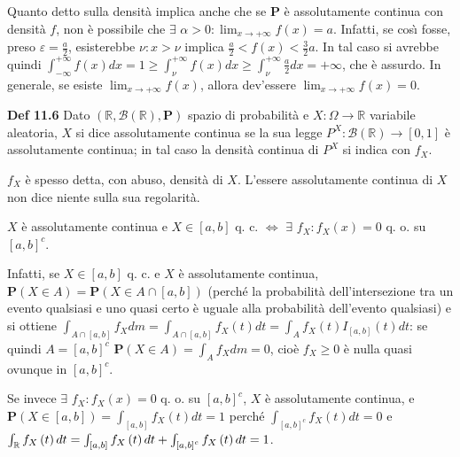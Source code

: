 \documentclass{article}
\begin{document}
Quanto detto sulla densit\`{a} implica anche che se $\mathbf{P}$ \`{e}
assolutamente continua con densit\`{a} $f$, non \`{e} possibile che $\exists 
$ $\alpha >0:\lim_{x\rightarrow +\infty }f\left( x\right) =a$. Infatti, se
cos\`{\i} fosse, preso $\varepsilon =\frac{a}{2}$, esisterebbe $\nu :x>\nu $
implica $\frac{a}{2}<f\left( x\right) <\frac{3}{2}a$. In tal caso si avrebbe
quindi $\int_{-\infty }^{+\infty }f\left( x\right) dx=1\geq \int_{\nu
}^{+\infty }f\left( x\right) dx\geq \int_{\nu }^{+\infty }\frac{a}{2}%
dx=+\infty $, che \`{e} assurdo. In generale, se esiste $\lim_{x\rightarrow
+\infty }f\left( x\right) $, allora dev'essere $\lim_{x\rightarrow +\infty
}f\left( x\right) =0$.

\textbf{Def 11.6} Dato $\left( 
\mathbb{R}
,\mathcal{B}\left( 
\mathbb{R}
\right) ,\mathbf{P}\right) $ spazio di probabilit\`{a} e $X:\Omega
\rightarrow 
\mathbb{R}
$ variabile aleatoria, $X$ si dice assolutamente continua se la sua legge $%
P^{X}:\mathcal{B}\left( 
\mathbb{R}
\right) \rightarrow \left[ 0,1\right] $ \`{e} assolutamente continua; in tal
caso la densit\`{a} continua di $P^{X}$ si indica con $f_{X}$.

$f_{X}$ \`{e} spesso detta, con abuso, densit\`{a} di $X$. L'essere
assolutamente continua di $X$ non dice niente sulla sua regolarit\`{a}.

$X$ \`{e} assolutamente continua e $X\in \left[ a,b\right] $ q. c. $%
\Longleftrightarrow $ $\exists $ $f_{X}:f_{X}\left( x\right) =0$ q. o. su $%
\left[ a,b\right] ^{c}$.

Infatti, se $X\in \left[ a,b\right] $ q. c. e $X$ \`{e} assolutamente
continua, $\mathbf{P}\left( X\in A\right) =\mathbf{P}\left( X\in A\cap \left[
a,b\right] \right) $ (perch\'{e} la probabilit\`{a} dell'intersezione tra un
evento qualsiasi e uno quasi certo \`{e} uguale alla probabilit\`{a}
dell'evento qualsiasi) e si ottiene $\int_{A\cap \left[ a,b\right]
}f_{X}dm=\int_{A\cap \left[ a,b\right] }f_{X}\left( t\right)
dt=\int_{A}f_{X}\left( t\right) I_{\left[ a,b\right] }\left( t\right) dt$:
se quindi $A=\left[ a,b\right] ^{c}$ $\mathbf{P}\left( X\in A\right)
=\int_{A}f_{X}dm=0$, cio\`{e} $f_{X}\geq 0$ \`{e} nulla quasi ovunque in $%
\left[ a,b\right] ^{c}$.

Se invece $\exists $ $f_{X}:f_{X}\left( x\right) =0$ q. o. su $\left[ a,b%
\right] ^{c}$, $X$ \`{e} assolutamente continua, e $\mathbf{P}\left( X\in %
\left[ a,b\right] \right) =\int_{\left[ a,b\right] }f_{X}\left( t\right)
dt=1 $ perch\'{e} $\int_{\left[ a,b\right] ^{c}}f_{X}\left( t\right) dt=0$ e 
$\int_{%
\mathbb{R}
}f_{X}\left( t\right) dt=\int_{\left[ a,b\right] }f_{X}\left( t\right)
dt+\int_{\left[ a,b\right] ^{c}}f_{X}\left( t\right) dt=1$.
\end{document}
